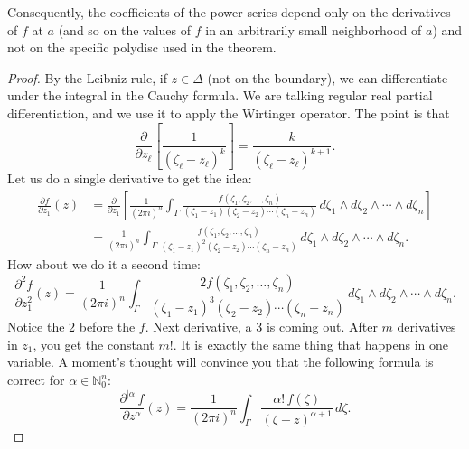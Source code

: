 \documentclass[12pt,openany]{book}
\newcommand{\sabs}[1]{\lvert {#1} \rvert}
\newcommand{\N}{{\mathbb{N}}}
\theoremstyle{plain}
\theoremstyle{remark}
\theoremstyle{definition}
\theoremstyle{exercise}
\theoremstyle{example}
\begin{document}
Consequently, the coefficients of the power series depend only on
the derivatives of $f$ at $a$
(and so on the values of $f$ in an arbitrarily small
neighborhood of $a$) and not on the specific polydisc used in the theorem.

\begin{proof}
By the Leibniz rule,
if $z \in \Delta$ (not on the boundary),
we can differentiate under the integral in the Cauchy formula.
We are talking regular real
partial differentiation, and we use it to apply the Wirtinger operator.
The point is that
\begin{equation*}
\frac{\partial}{\partial z_\ell} \left[
\frac{1}{{(\zeta_\ell-z_\ell)}^k} \right]
=
\frac{k}{{(\zeta_\ell-z_\ell)}^{k+1}} .
\end{equation*}
Let us do a single derivative to
get the idea:
\begin{equation*}
\begin{split}
\frac{\partial f}{\partial z_1}(z) &=
\frac{\partial}{\partial z_1} \left[
\frac{1}{{(2\pi i)}^n}
\int_{\Gamma}
\frac{f(\zeta_1,\zeta_2,\ldots,\zeta_n)}{(\zeta_1-z_1)(\zeta_2-z_2)\cdots(\zeta_n-z_n)}
\,
d \zeta_1
\wedge
d \zeta_2
\wedge
\cdots
\wedge
d \zeta_n
\right]
\\
& =
\frac{1}{{(2\pi i)}^n}
\int_{\Gamma}
\frac{f(\zeta_1,\zeta_2,\ldots,\zeta_n)}{{(\zeta_1-z_1)}^2(\zeta_2-z_2)\cdots(\zeta_n-z_n)}
\,
d \zeta_1
\wedge
d \zeta_2
\wedge
\cdots
\wedge
d \zeta_n .
\end{split}
\end{equation*}
How about we do it a second time:
\begin{equation*}
\frac{\partial^2 f}{\partial z_1^2}(z)
=
\frac{1}{{(2\pi i)}^n}
\int_{\Gamma}
\frac{2 f(\zeta_1,\zeta_2,\ldots,\zeta_n)}{{(\zeta_1-z_1)}^3(\zeta_2-z_2)\cdots(\zeta_n-z_n)}
\,
d \zeta_1
\wedge
d \zeta_2
\wedge
\cdots
\wedge
d \zeta_n .
\end{equation*}
Notice the $2$ before the $f$.  Next derivative, a $3$ is coming out.
After $m$ derivatives in $z_1$, you get the constant $m!$.
It is exactly the same thing that happens in one variable.  A moment's
thought will convince you that the following formula is correct for
$\alpha \in \N_0^n$:
\begin{equation*}
\frac{\partial^{\sabs{\alpha}}f}{\partial z^\alpha} (z) =
\frac{1}{{(2\pi i)}^n}
\int_{\Gamma}
\frac{\alpha! \, f(\zeta)}{{(\zeta-z)}^{\alpha+1}}
\,
d \zeta .
\end{equation*}


\end{proof}
\end{document}
